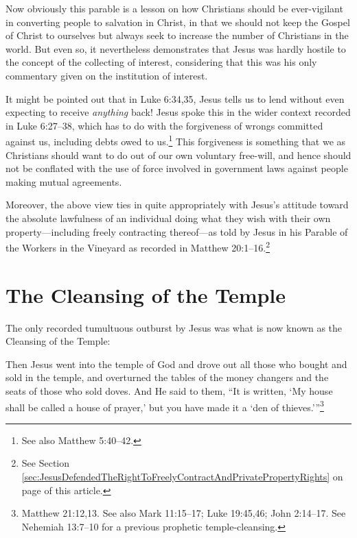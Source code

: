 \documentclass[letterpaper,12pt]{article}
\newenvironment{squote}
  {\small\quote}
  {\endquote\normalsize}
\begin{document}
Now obviously this parable is a lesson on how Christians should be ever-vigilant in converting people to salvation in Christ, in that we should not keep the Gospel of Christ to ourselves but always seek to increase the number of Christians in the world. But even so, it nevertheless demonstrates that Jesus was hardly hostile to the concept of the collecting of interest, considering that this was his only commentary given on the institution of interest.

It might be pointed out that in Luke 6:34,35, Jesus tells us to lend without even expecting to receive \emph{anything} back! Jesus spoke this in the wider context recorded in Luke 6:27--38, which has to do with the forgiveness of wrongs committed against us, including debts owed to us.\footnote{See also Matthew 5:40--42.} This forgiveness is something that we as Christians should want to do out of our own voluntary free-will, and hence should not be conflated with the use of force involved in government laws against people making mutual agreements.

Moreover, the above view ties in quite appropriately with Jesus's attitude toward the absolute lawfulness of an individual doing what they wish with their own property---including freely contracting thereof---as told by Jesus in his Parable of the Workers in the Vineyard as recorded in Matthew 20:1--16.\footnote{See Section \ref{sec:JesusDefendedTheRightToFreelyContractAndPrivatePropertyRights} on page \pageref{sec:JesusDefendedTheRightToFreelyContractAndPrivatePropertyRights} of this article.}

\section{The Cleansing of the Temple}
\label{sec:TheCleansingOfTheTemple}

The only recorded tumultuous outburst by Jesus was what is now known as the Cleansing of the Temple:

\begin{squote}
Then Jesus went into the temple of God and drove out all those who bought and sold in the temple, and overturned the tables of the money changers and the seats of those who sold doves. And He said to them, ``It is written, `My house shall be called a house of prayer,' but you have made it a `den of thieves.'\thinspace''\footnote{Matthew 21:12,13. See also Mark 11:15--17; Luke 19:45,46; John 2:14--17. See Nehemiah 13:7--10 for a previous prophetic temple-cleansing.}
\end{squote}
\end{document}
